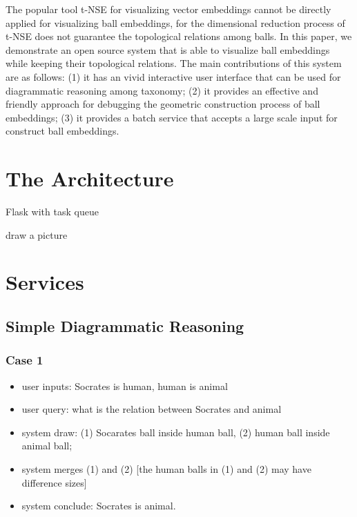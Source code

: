 \documentclass[runningheads]{llncs}
\begin{document}
The popular  tool t-NSE \cite{Maaten08} for visualizing vector embeddings cannot be directly applied for visualizing ball embeddings, for the dimensional reduction process of t-NSE does not guarantee the topological relations among balls. In this paper, we demonstrate an open source system that is able to visualize ball embeddings while keeping their topological relations. The main contributions of this system are as follows: (1) it has an vivid interactive user interface that can be used for diagrammatic reasoning among taxonomy; (2) it provides an effective and friendly approach for debugging the geometric construction process of ball embeddings; (3) it provides a batch service that accepts a large scale input for construct ball embeddings. 

\section{The Architecture}

Flask with task queue 

draw a picture

\section{Services}

\subsection{Simple Diagrammatic Reasoning}
\subsubsection{Case 1}
\begin{itemize}
	\item user inputs: Socrates is human, human is animal
	\item  user query: what is the relation between Socrates and animal
	\item  system draw: (1) Socarates ball inside human ball, (2) human ball inside animal ball; 
	\item system merges (1) and (2) [the human balls in (1) and (2) may have difference sizes]
	\item system conclude: Socrates is animal.
\end{itemize}
\end{document}
